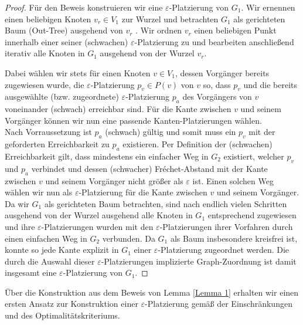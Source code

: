 \documentclass[a4paper, 12pt, twoside]{article}
\theoremstyle{Format1} %
\begin{document}
\begin{proof}
Für den Beweis konstruieren wir eine $\varepsilon$-Platzierung von $G_1$.
Wir ernennen einen beliebigen Knoten $v_r \in V_1$ zur Wurzel und betrachten $G_1$ als gerichteten Baum (Out-Tree) ausgehend von $v_r$ .
Wir ordnen $v_r$ einen beliebigen Punkt innerhalb einer seiner (schwachen) $\varepsilon$-Platzierung zu und bearbeiten anschließend iterativ alle
Knoten in $G_1$ ausgehend von der Wurzel $v_r$.

Dabei wählen wir stets für einen Knoten $v \in V_1$, dessen Vorgänger bereits zugewiesen wurde,
die $\varepsilon$-Platzierung $p_v \in P(v)$ von $v$ so, dass $p_v$
und die bereits ausgewählte (bzw. zugeordnete) $\varepsilon$-Platzierung $p_a$ des Vorgängers von $v$ voneinander (schwach) erreichbar sind.
Für die Kante zwischen $v$ und seinem Vorgänger können wir nun eine passende Kanten-Platzierungen wählen.
\\
Nach Vorraussetzung ist $p_a$ (schwach) gültig und somit muss ein $p_v$ mit der geforderten Erreichbarkeit zu $p_a$ existieren.
Per Definition der (schwachen) Erreichbarkeit gilt, dass mindestens ein einfacher Weg in $G_2$ existiert, welcher $p_v$ und $p_a$ verbindet
und dessen (schwacher) Fréchet-Abstand mit der Kante zwischen $v$ und seinem Vorgänger nicht größer als $\varepsilon$ ist.
Einen solchen Weg wählen wir nun als $\varepsilon$-Platzierung für die Kante zwischen $v$ und seinem Vorgänger.
\\
Da wir $G_1$ als gerichteten Baum betrachten, sind nach endlich vielen Schritten ausgehend von der Wurzel ausgehend alle Knoten in $G_1$
entsprechend zugewiesen und ihre $\varepsilon$-Platzierungen
wurden mit den $\varepsilon$-Platzierungen ihrer Vorfahren durch einen einfachen Weg in $G_2$ verbunden.
Da $G_1$ als Baum insbesondere kreisfrei ist, konnte so jede Kante explizit in $G_1$ einer $\varepsilon$-Platzierung zugeordnet werden.
Die durch die Auswahl dieser $\varepsilon$-Platzierungen implizierte Graph-Zuordnung ist damit insgesamt eine $\varepsilon$-Platzierung von $G_1$.
\end{proof}

Über die Konstruktion aus dem Beweis von Lemma \ref{Lemma 1} erhalten wir einen ersten Ansatz zur Konstruktion einer $\varepsilon$-Platzierung gemäß der Einschränkungen und
des Optimalitätskriteriums.
\end{document}
